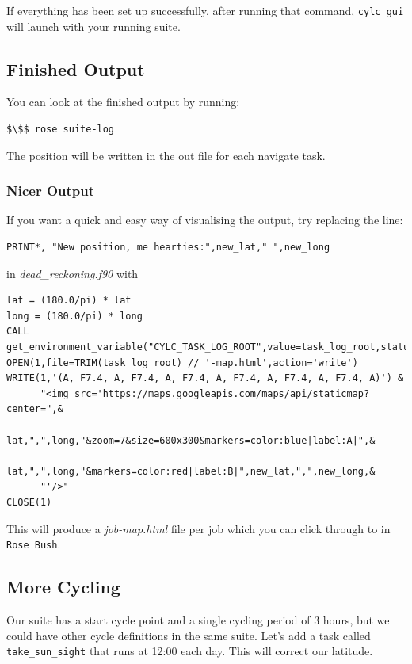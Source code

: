 If everything has been set up successfully, after running that command, \lstinline{cylc gui} will launch with your running suite.

\subsection{Finished Output}

You can look at the finished output by running:

\begin{lstlisting}[mathescape, language=bash]
$\$$ rose suite-log
\end{lstlisting}

The position will be written in the out file for each navigate task.

\subsubsection{Nicer Output}

If you want a quick and easy way of visualising the output, try replacing the line:

\lstset{language=Fortran}
\begin{lstlisting}[columns=fullflexible]
PRINT*, "New position, me hearties:",new_lat," ",new_long
\end{lstlisting}

in {\em dead\_reckoning.f90} with

\lstset{language=Fortran}
\begin{lstlisting}[columns=fullflexible]
lat = (180.0/pi) * lat
long = (180.0/pi) * long
CALL get_environment_variable("CYLC_TASK_LOG_ROOT",value=task_log_root,status=code)
OPEN(1,file=TRIM(task_log_root) // '-map.html',action='write')
WRITE(1,'(A, F7.4, A, F7.4, A, F7.4, A, F7.4, A, F7.4, A, F7.4, A)') &
      "<img src='https://maps.googleapis.com/maps/api/staticmap?center=",&
      lat,",",long,"&zoom=7&size=600x300&markers=color:blue|label:A|",&
      lat,",",long,"&markers=color:red|label:B|",new_lat,",",new_long,&
      "'/>"
CLOSE(1)
\end{lstlisting}

This will produce a {\em job-map.html} file per job which you can click through to in \lstinline{Rose Bush}.

\subsection{More Cycling}

Our suite has a start cycle point and a single cycling period of 3 hours, but we could have other cycle definitions in the same suite. Let's add a task called \lstinline{take_sun_sight} that runs at 12:00 each day. This will correct our latitude.

